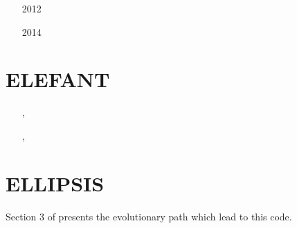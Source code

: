 \begin{small}
\begin{itemize}
\item[2012] \cite{maierova}
\item[2014] \cite{mals14}
\end{itemize}
\end{small}


\section{ELEFANT}

\begin{small}
\begin{itemize}
\item[\twothousandfifteen]   \textcite{tosn15},  \textcite{matv15}
\item[\twothousandsixteen]   \textcite{busa16}
\item[\twothousandseventeen] \textcite{thie17},  \textcite{latb17}
\item[\twothousandeighteen]  \textcite{pltv18}
\item[\twothousandnineteen]  \textcite{frtv19}
\end{itemize}
\end{small}

\section{ELLIPSIS} 
Section 3 of \cite{qums07} presents the evolutionary path which lead to this code.

